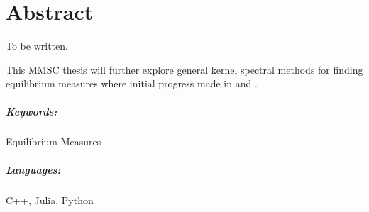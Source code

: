 \chapter*{Abstract}
To be written.

This MMSC thesis will further explore general kernel spectral methods for finding equilibrium measures where initial progress made in \cite{2020-power-law-kernels} and \cite{2021-arbitrary-dimensions}.

\paragraph{Keywords:}
Equilibrium Measures


\paragraph{Languages:}
C++, Julia, Python
